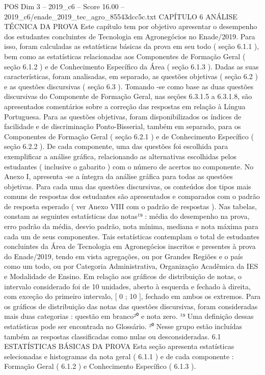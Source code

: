 \begin{textsample}{POS Dim 3 – 2019\_c6 – Score 16.00 – 2019\_c6/enade\_2019\_tec\_agro\_85543dcc5c.txt}  \label{ex:f3_pos_012}
CAPÍTULO 6 ANÁLISE TÉCNICA DA PROVA Este capítulo tem por objetivo apresentar o desempenho dos estudantes concluintes de Tecnologia em Agronegócios no Enade/2019.
Para isso, foram calculadas as estatísticas básicas da prova em seu todo ( seção 6.1.1 ), bem como as estatísticas relacionadas aos Componentes de Formação Geral ( seção 6.1.2 ) e de Conhecimento Específico da Área ( seção 6.1.3 ).
Dadas as suas características, foram analisadas, em separado, as questões objetivas ( seção 6.2 ) e as questões discursivas ( seção 6.3 ).
Tomando -se como base as duas questões discursivas do Componente de Formação Geral, nas seções 6.3.1.5 a 6.3.1.8, são apresentados comentários sobre a correção das respostas em relação à Língua Portuguesa.
Para as questões objetivas, foram disponibilizados os índices de facilidade e de discriminação Ponto-Bisserial, também em separado, para os Componentes de Formação Geral ( seção 6.2.1 ) e de Conhecimento Específico ( seção 6.2.2 ).
De cada componente, uma das questões foi escolhida para exemplificar a análise gráfica, relacionando as alternativas escolhidas pelos estudantes ( inclusive o gabarito ) com o número de acertos no componente.
No Anexo I, apresenta -se a íntegra da análise gráfica para todas as questões objetivas.
Para cada uma das questões discursivas, os conteúdos dos tipos mais comuns de respostas dos estudantes são apresentados e comparados com o padrão de resposta esperado ( ver Anexo VIII com o padrão de respostas ).
Nas tabelas, constam as seguintes estatísticas das notas¹⁹ : média do desempenho na prova, erro padrão da média, desvio padrão, nota mínima, mediana e nota máxima para cada um de seus componentes.
Tais estatísticas contemplam o total de estudantes concluintes da Área de Tecnologia em Agronegócios inscritos e presentes à prova do Enade/2019, tendo em vista agregações, ou por Grandes Regiões e o país como um todo, ou por Categoria Administrativa, Organização Acadêmica da IES e Modalidade de Ensino.
Em relação aos gráficos de distribuição de notas, o intervalo considerado foi de 10 unidades, aberto à esquerda e fechado à direita, com exceção do primeiro intervalo, [ 0 ; 10 ], fechado em ambos os extremos.
Para os gráficos de distribuição das notas das questões discursivas, foram consideradas mais duas categorias : questão em branco²⁰ e nota zero. ¹⁹ Uma definição dessas estatísticas pode ser encontrada no Glossário. ²⁰ Nesse grupo estão incluídas também as respostas classificadas como nulas ou desconsideradas. 6.1 ESTATÍSTICAS BÁSICAS DA PROVA Esta seção apresenta estatísticas selecionadas e histogramas da nota geral ( 6.1.1 ) e de cada componente : Formação Geral ( 6.1.2 ) e Conhecimento Específico ( 6.1.3 ).

\end{textsample}
